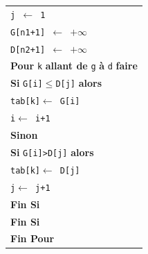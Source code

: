 \documentclass[10pt,fleqn]{article} %
\newcommand{\tsf}[1]{\small{\texttt{#1}}}
\begin{document}
\begin{minipage}[c]{.48\linewidth}
\begin{pseudo}
\begin{tabular}{p{}}
\hspace{.4cm} \tsf{j $\leftarrow$ 1}\\
\hspace{.4cm} \tsf{G[n1+1] $\leftarrow$ $+\infty$}\\
\hspace{.4cm} \tsf{D[n2+1] $\leftarrow$ $+\infty$}\\
\hspace{.4cm} \textbf{Pour} \tsf{k} \textbf{allant de} \tsf{g} \textbf{à} \tsf{d} \textbf{faire}\\
\hspace{.8cm} \textbf{Si}  \tsf{G[i]$\leq$D[j]} \textbf{alors} \\
\hspace{1.2cm} \tsf{tab[k]$\leftarrow$ G[i]} \\
\hspace{1.2cm} \tsf{i$\leftarrow$ i+1} \\
\hspace{.8cm} \textbf{Sinon} \\
\hspace{1.2cm} \textbf{Si} \tsf{G[i]>D[j]} \textbf{alors} \\
\hspace{1.6cm} \tsf{tab[k]$\leftarrow$ D[j]} \\
\hspace{1.6cm} \tsf{j$\leftarrow$ j+1} \\
\hspace{1.2cm} \textbf{Fin Si} \\
\hspace{.8cm} \textbf{Fin Si} \\
\hspace{.4cm}  \textbf{Fin Pour}\\
\hline
\end{tabular}
\end{pseudo}
\end{minipage} \hfill
\end{document}

